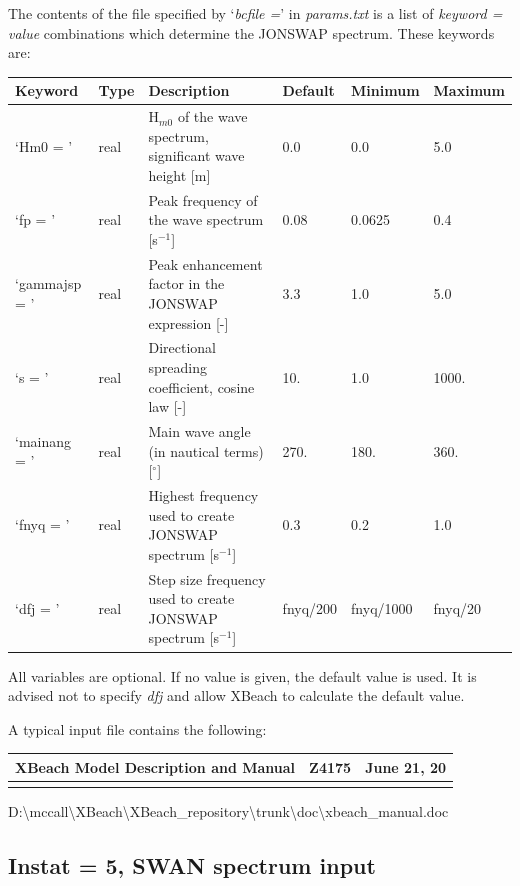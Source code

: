 The contents of the file specified by `\textit{bcfile =}' in \textit{params.txt} is a list of \textit{keyword = value} combinations which determine the JONSWAP spectrum. These keywords are:

\begin{tabular}{|p{0.7in}|p{0.4in}|p{1.3in}|p{0.5in}|p{0.5in}|p{0.5in}|} \hline 
Keyword & Type & Description & Default & Minimum & Maximum \\ \hline 
`Hm0 = ' & real & H${}_{m0}$ of the wave spectrum, significant wave height [m] & 0.0 & 0.0 & 5.0 \\ \hline 
`fp = ' & real & Peak frequency of the wave spectrum [s${}^{-1}$] & 0.08 & 0.0625 & 0.4 \\ \hline 
`gammajsp = ' & real & Peak enhancement factor in the JONSWAP expression [-] & 3.3 & 1.0 & 5.0 \\ \hline 
`s = ' & real & Directional spreading coefficient, cosine law [-] & 10. & 1.0 & 1000. \\ \hline 
`mainang = ' & real & Main wave angle (in nautical terms) [${}^\circ$] & 270. & 180. & 360. \\ \hline 
`fnyq = ' & real & Highest frequency used to create JONSWAP spectrum [s${}^{-1}$] & 0.3 & 0.2 & 1.0 \\ \hline 
`dfj = ' & real & Step size frequency used to create JONSWAP spectrum [s${}^{-1}$] & fnyq/200 & fnyq/1000 & fnyq/20 \\ \hline 
\end{tabular}

All variables are optional. If no value is given, the default value is used. It is advised not to specify \textit{dfj} and allow XBeach to calculate the default value.

A typical input file contains the following:

\begin{tabular}{|p{1.5in}|p{1.5in}|p{1.5in}|} \hline 
XBeach Model Description and Manual & Z4175 & June 21, 20 \\ \hline 
&  &  \\ \hline 
\end{tabular}

D:\textbackslash mccall\textbackslash XBeach\textbackslash XBeach\_repository\textbackslash trunk\textbackslash doc\textbackslash xbeach\_manual.doc


\subsection{Instat = 5, SWAN spectrum input}

